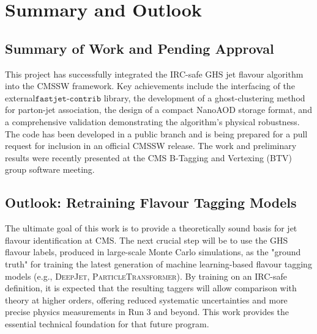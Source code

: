 \documentclass[10pt,twocolumn]{article}
\begin{document}
\section{Summary and Outlook} %
\label{sec:sum}

\subsection{Summary of Work and Pending Approval}
\label{sec:sum-summary}

This project has successfully integrated the IRC-safe GHS jet flavour algorithm into the CMSSW framework. Key achievements include the interfacing of the external$\texttt{fastjet-contrib}$ library, the development of a ghost-clustering method for parton-jet association, the design of a compact NanoAOD storage format, and a comprehensive validation demonstrating the algorithm's physical robustness. The code has been developed in a public branch and is being prepared for a pull request for inclusion in an official CMSSW release. The work and preliminary results were recently presented at the CMS B-Tagging and Vertexing (BTV) group software meeting.

\subsection{Outlook: Retraining Flavour Tagging Models} %
\label{sec:sum-outlook}

The ultimate goal of this work is to provide a theoretically sound basis for jet flavour identification at CMS. The next crucial step will be to use the GHS flavour labels, produced in large-scale Monte Carlo simulations, as the "ground truth" for training the latest generation of machine learning-based flavour tagging models (e.g., \textsc{DeepJet}, \textsc{ParticleTransformer}). By training on an IRC-safe definition, it is expected that the resulting taggers will allow comparison with theory at higher orders, offering reduced systematic uncertainties and more precise physics measurements in Run 3 and beyond. This work provides the essential technical foundation for that future program.

\printbibliography
\end{document}
